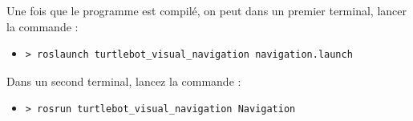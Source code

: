 \documentclass[10pt,a4paper]{article}
\begin{document}
Une fois que le programme est compilé, on peut dans un premier terminal, lancer la commande :
\begin{itemize}
\item[] \begin{verbatim}> roslaunch turtlebot_visual_navigation navigation.launch \end{verbatim}
\end{itemize}

Dans un second terminal, lancez la commande :
\begin{itemize}
\item[] \begin{verbatim}> rosrun turtlebot_visual_navigation Navigation \end{verbatim}
\end{itemize}
\end{document}
